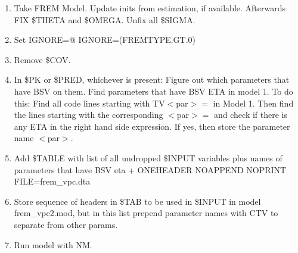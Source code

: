 \begin{enumerate}
	\item Take FREM Model. Update inits from estimation, if available. Afterwards FIX \$THETA and \$OMEGA. Unfix all \$SIGMA.
	\item Set IGNORE=@ IGNORE=(FREMTYPE.GT.0)
	\item Remove \$COV.
	\item In \$PK or \$PRED, whichever is present:
Figure out which parameters that have BSV %
on them.
Find parameters
that have BSV ETA %
in model 1.
To do this: Find all code lines starting with TV$<$par$>=$ in Model 1. Then find the lines starting with the corresponding $<$par$>=$ and
check if there is any ETA in the right hand side expression. If yes, then store the parameter name $<$par$>$.  
	\item Add \$TABLE with list of all undropped \$INPUT variables plus names of parameters that have BSV eta  + ONEHEADER NOAPPEND NOPRINT FILE=frem\_vpc.dta
	\item Store sequence of headers in \$TAB to be used in \$INPUT in model frem\_vpc2.mod, but in this list prepend parameter names with CTV to separate from other params.
	\item Run model with NM.
\end{enumerate}

